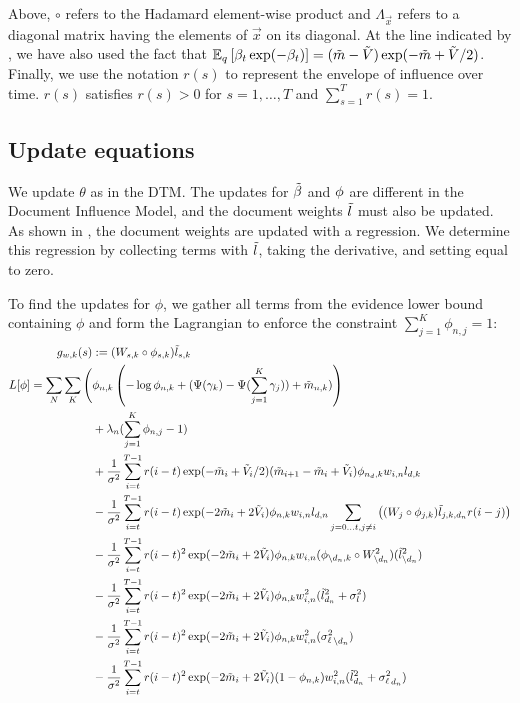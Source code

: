 Above, $\circ$ refers to the Hadamard element-wise product and
$\Lambda_{\vec{x}}$ refers to a diagonal matrix having the elements of
$\vec{x}$ on its diagonal.  At the line indicated by ,
we have also used the fact that $\mathbb{E}_q\left[\beta_t \exp(-\beta_t)\right] =
(\tilde{m} - \tilde{V}) \exp(-\tilde{m} + \tilde{V} / 2)$.  Finally, we use the notation
$r(s)$ to represent the envelope of influence over time.  $r(s)$
satisfies $r(s) > 0$ for $s = 1, \ldots, T$ and $\sum_{s=1}^T r(s) =
1$.

\subsection{Update equations} \label{section:updates}
We update $\theta$ as in the DTM.  The updates for $\tilde{\beta}$
and $\phi$ are different in the Document Influence Model, and the
document weights $\tilde{l}$ must also be updated.  As shown in
, the document weights are updated with a
regression.  We determine this regression by collecting terms with
$\tilde{l}$, taking the derivative, and setting equal to zero.

To find the updates for $\phi$, we gather all terms from the evidence
lower bound containing $\phi$ and form the Lagrangian to enforce the
constraint $\sum_{j=1}^K \phi_{n,j} = 1$:
\begin{align*}
g_{w,k}(s) & := (W_{s,k} \circ \phi_{s,k}) \tilde{l}_{s,k} \\  \nonumber
L[\phi] = \sum_N \sum_K \Bigg( & \phi_{n,k} \left ( -\log{\phi_{n,k}} + (\Psi(\gamma_k) - \Psi(\sum_{j=1}^K \gamma_j)) + \tilde{m}_{n,k}) \right) \\  \nonumber
&     + \lambda_n (\sum_{j=1}^K \phi_{n,j} - 1) \\  \nonumber
&  + \frac{1}{\sigma^2} \sum_{i=t}^{T-1} r(i-t) \exp(-\tilde{m}_i + \tilde{V}_i / 2) (\tilde{m}_{i + 1} - \tilde{m}_i + \tilde{V}_i) \phi_{n_d,k} w_{i,n} l_{d,k} \\  \nonumber
&  - \frac{1} {\sigma^2} \sum_{i=t}^{T-1} r(i-t) \exp(-2\tilde{m}_i + 2 \tilde{V}_i) \phi_{n,k} w_{i,n} l_{d,n} \sum_{j=0\ldots t, j \neq i} \left( (W_{j} \circ \phi_{j,k}) \tilde{l}_{j,k,d_n} r(i-j) \right) \\  \nonumber
&  - \frac{1} {\sigma^2} \sum_{i=t}^{T-1} r(i-t)^2 \exp(-2\tilde{m}_i + 2 \tilde{V}_i) \phi_{n,k} w_{i,n} (\phi_{\setminus d_n,k} \circ W_{\setminus d_n}^2) (\tilde{l}_{\setminus d_n}^2) \\  \nonumber
&  - \frac{1} {\sigma^2} \sum_{i=t}^{T-1} r(i-t)^2 \exp(-2\tilde{m}_i + 2 \tilde{V}_i) \phi_{n,k} w_{i,n}^2 (\tilde{l}_{d_n}^2 + \sigma_l^2) \\  \nonumber
&  - \frac{1} {\sigma^2} \sum_{i=t}^{T-1} r(i-t)^2 \exp(-2\tilde{m}_i + 2 \tilde{V}_i) \phi_{n,k} w_{i,n}^2 ({{\sigma^2_{\ell}}}_{\setminus d_n}) \\  \nonumber
&  - \frac{1} {\sigma^2} \sum_{i=t}^{T-1} r(i-t)^2 \exp(-2\tilde{m}_i + 2 \tilde{V}_i) (1 - \phi_{n,k}) w_{i,n}^2 (\tilde{l}_{d_n}^2 + {{\sigma^2_{\ell}}}_{d_n})  \nonumber
\end{align*}

